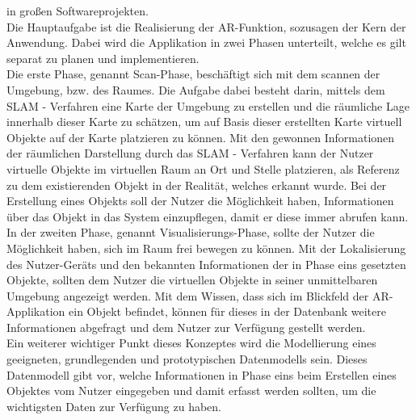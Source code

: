 in großen Softwareprojekten.
\\
\linebreak
Die Hauptaufgabe ist die Realisierung der \acl{AR}-Funktion, sozusagen der Kern der Anwendung. Dabei wird die Applikation in zwei 
Phasen unterteilt, welche es gilt separat zu planen und implementieren.
\\ 
\linebreak
Die erste Phase, genannt Scan-Phase, beschäftigt sich mit dem scannen der Umgebung, bzw. des Raumes. Die Aufgabe dabei besteht darin, 
mittels dem \ac{SLAM} - Verfahren eine Karte der Umgebung zu erstellen und die räumliche Lage innerhalb dieser Karte zu schätzen, um 
auf Basis dieser erstellten Karte virtuell Objekte auf der Karte platzieren zu können. Mit den gewonnen Informationen der räumlichen 
Darstellung durch das \acs{SLAM} - Verfahren kann der Nutzer virtuelle Objekte im virtuellen Raum an Ort und Stelle platzieren, als 
Referenz zu dem existierenden Objekt in der Realität, welches erkannt wurde. Bei der Erstellung eines Objekts soll der Nutzer die 
Möglichkeit haben, Informationen über das Objekt in das System einzupflegen, damit er diese immer abrufen kann. 
\\ 
\linebreak
In der zweiten Phase, genannt Visualisierungs-Phase, sollte der Nutzer die Möglichkeit haben, sich im Raum frei bewegen zu können. 
Mit der Lokalisierung des Nutzer-Geräts und den bekannten Informationen der in Phase eins gesetzten Objekte, sollten dem Nutzer 
die virtuellen Objekte in seiner unmittelbaren Umgebung angezeigt werden. Mit dem Wissen, dass sich im Blickfeld der \acs{AR}-Applikation 
ein Objekt befindet, können für dieses in der Datenbank weitere Informationen abgefragt und dem Nutzer zur Verfügung gestellt werden.
\\ 
\linebreak
Ein weiterer wichtiger Punkt dieses Konzeptes wird die Modellierung eines geeigneten, grundlegenden und prototypischen Datenmodells sein. 
Dieses Datenmodell gibt vor, welche Informationen in Phase eins beim Erstellen eines Objektes vom Nutzer eingegeben und damit erfasst 
werden sollten, um die wichtigsten Daten zur Verfügung zu haben. 

